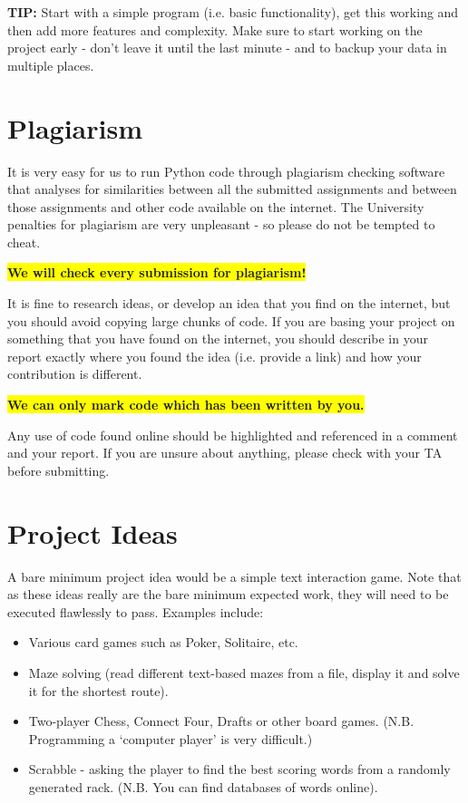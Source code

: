 \documentclass[12pt]{report}
\begin{document}
\bigskip
\textbf{TIP:} Start with a simple program (i.e. basic functionality), get this working and then add more features and complexity. Make sure to start working on the project early - don't leave it until the last minute - and to backup your data in multiple places.

\section*{Plagiarism}
It is very easy for us to run Python code through plagiarism checking software that analyses for similarities between all the submitted assignments and between those assignments and other code available on the internet. The University penalties for plagiarism are very unpleasant - so please do not be tempted to cheat.

\begin{center}
\colorbox{yellow}{\textbf{We will check every submission for plagiarism!}}
\end{center}

It is fine to research ideas, or develop an idea that you find on the internet, but you should avoid copying large chunks of code. If you are basing your project on something that you have found on the internet, you should describe in your report exactly where you found the idea (i.e. provide a link) and how your contribution is different.

\begin{center}
    \colorbox{yellow}{\textbf{We can only mark code which has been written by you.}}
\end{center}
Any use of code found online should be highlighted and referenced in a comment and your report. If you are unsure about anything, please check with your TA before submitting.

\section*{Project Ideas}

A bare minimum project idea would be a simple text interaction game. Note that as these ideas really are the bare minimum expected work, they will need to be executed flawlessly to pass. Examples include:
\begin{itemize}
    \item Various card games such as Poker, Solitaire, etc.
    \item Maze solving (read different text-based mazes from a file, display it and solve it for the shortest route).
    \item Two-player Chess, Connect Four, Drafts or other board games. (N.B. Programming a `computer player' is very difficult.)
    \item Scrabble - asking the player to find the best scoring words from a randomly generated rack. (N.B. You can find databases of words online).
\end{itemize}
\end{document}
